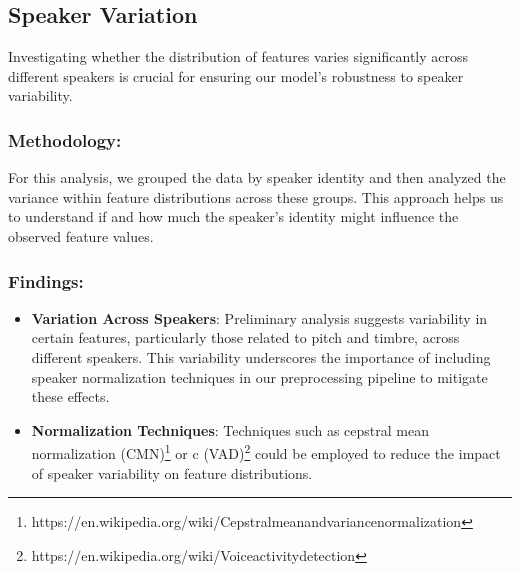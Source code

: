 \subsection{Speaker Variation}

Investigating whether the distribution of features varies significantly across different speakers is crucial for ensuring our model's robustness to speaker variability.

\subsubsection{Methodology:}

For this analysis, we grouped the data by speaker identity and then analyzed the variance within feature distributions across these groups.
This approach helps us to understand if and how much the speaker's identity might influence the observed feature values.

\subsubsection{Findings:}

\begin{itemize}
    \item \textbf{Variation Across Speakers}: Preliminary analysis suggests variability in certain features, particularly those related to pitch and timbre, across different speakers.
    This variability underscores the importance of including speaker normalization techniques in our preprocessing pipeline to mitigate these effects.
    \item \textbf{Normalization Techniques}: Techniques such as cepstral mean normalization (CMN)\footnote{https://en.wikipedia.org/wiki/Cepstral\textunderscore mean\textunderscore and\textunderscore variance\textunderscore normalization} or c (VAD)\footnote{https://en.wikipedia.org/wiki/Voice\textunderscore activity\textunderscore detection} could be employed to reduce the impact of speaker variability on feature distributions.
\end{itemize}


